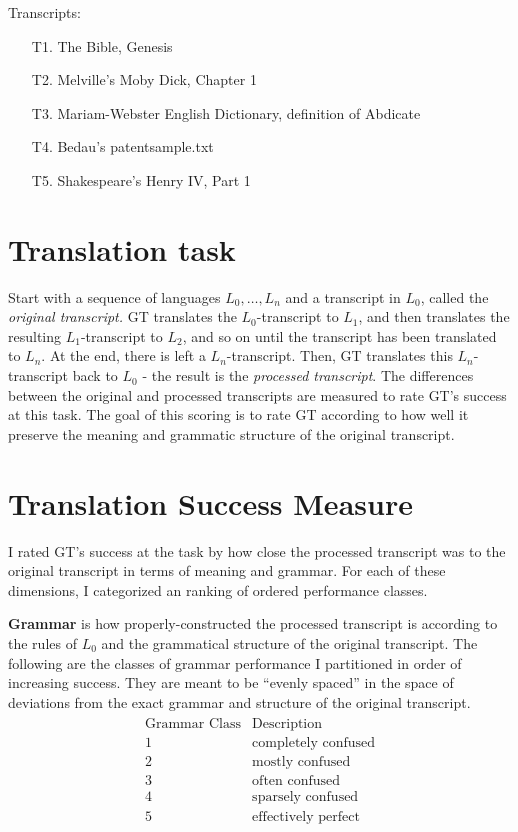 \documentclass{article}
\begin{document}
\vspace{1em} \noindent
Transcripts:
\begin{enumerate}
  \item[T1.] The Bible, Genesis
  \item[T2.] Melville's Moby Dick, Chapter 1
  \item[T3.] Mariam-Webster English Dictionary, definition of Abdicate
  \item[T4.] Bedau's patentsample.txt
  \item[T5.] Shakespeare's Henry IV, Part 1
\end{enumerate}

\section{Translation task}


Start with a sequence of languages $L_0, \dots, L_n$ and a transcript in $L_0$, called the \textit{original transcript.}
GT translates the $L_0$-transcript to $L_1$, and then translates the resulting $L_1$-transcript to $L_2$, and so on until the transcript has been translated to $L_n$.
At the end, there is left a $L_n$-transcript.
Then, GT translates this $L_n$-transcript back to $L_0$ - the result is the \textit{processed transcript}.
The differences between the original and processed transcripts are measured to rate GT's success at this task.
The goal of this scoring is to rate GT according to how well it preserve the meaning and grammatic structure of the original transcript.


\section{Translation Success Measure}


I rated GT's success at the task by how close the processed transcript was to the original transcript in terms of meaning and grammar. For each of these dimensions, I categorized an ranking of ordered performance classes.




\textbf{Grammar} is how properly-constructed the processed transcript is according to the rules of $L_0$ and the grammatical structure of the original transcript.
The following are the classes of grammar performance I partitioned in order of increasing success.
They are meant to be ``evenly spaced'' in the space of deviations from the exact grammar and structure of the original transcript.
\begin{align*} \begin{array}{r|l}
\text{Grammar Class} & \text{Description} \\ \hline
1 & \text{completely confused} \\
2 & \text{mostly confused} \\
3 & \text{often confused} \\
4 & \text{sparsely confused} \\
5 & \text{effectively perfect}
\end{array} \end{align*}
\end{document}
